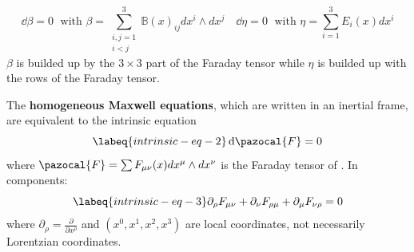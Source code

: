 \documentclass[../main.tex]{subfiles}
\begin{document}
\[
\dd{\beta}=0 \;\text{ with } \beta=\sum_{\substack{i,j=1\\i<j}}^3\mathbb{B}(x)_{ij}dx^i\wedge dx^j \quad \dd{\eta}=0 \;\text{ with } \eta=\sum_{i=1}^3 E_i(x)dx^i
\]
$\beta$ is builded up by the $3\times3$ part of the Faraday tensor while $\eta$ is builded up with the rows of the Faraday tensor.
\begin{proposition}
The \textbf{homogeneous Maxwell equations}, which are written in an inertial frame, are equivalent to the intrinsic equation \begin{equation}\labeq{intrinsic-eq-2}
\dd{\pazocal{F}}=0
\end{equation}
where $\pazocal{F}=\sum F_{\mu\nu}(x)dx^{\mu}\wedge dx^{\nu}$ is the Faraday tensor of . In components:
\begin{equation}\labeq{intrinsic-eq-3}
\partial_{\rho}F_{\mu\nu}+\partial_{\nu}F_{\rho\mu}+\partial_{\mu}F_{\nu\rho}=0
\end{equation}
where $\partial_{\rho}=\frac{\partial}{\partial x^{\rho}}$ and $(x^0,x^1,x^2,x^3)$ are local coordinates, not necessarily Lorentzian coordinates.
\end{proposition}
\end{document}
